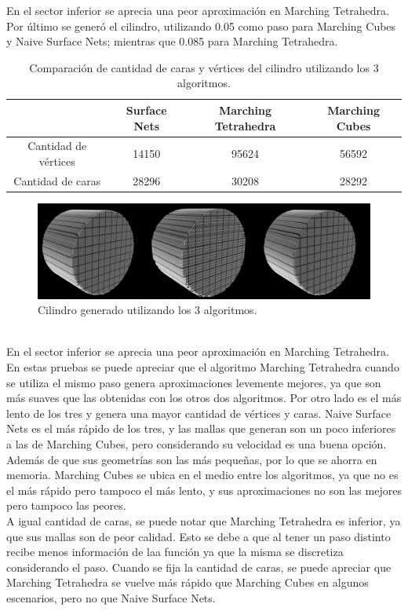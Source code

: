 \documentclass[12pt]{article}
\begin{document}
En el sector inferior se aprecia una peor aproximación en Marching Tetrahedra.
\\Por último se generó el cilindro, utilizando 0.05 como paso para Marching Cubes y Naive Surface Nets; mientras que 0.085 para Marching Tetrahedra.
\begin{table}[h!]
  \centering
  \label{tab:table1}
  \begin{tabular}{cccc}
    \toprule
    & Surface Nets & Marching Tetrahedra & Marching Cubes\\
    \midrule
    Cantidad de vértices & 14150 &  95624 & 56592 \\
    Cantidad de caras &  28296 & 30208 & 28292 \\
    \bottomrule
  \end{tabular}
  \caption{Comparación de cantidad de caras y vértices del cilindro utilizando los 3 algoritmos.}
\end{table}
\begin{figure}[h!]
\includegraphics[width=\linewidth,center]{cilindro2.png}
\caption{Cilindro generado utilizando los 3 algoritmos.}
\end{figure}
\\En el sector inferior se aprecia una peor aproximación en Marching Tetrahedra.
\\En estas pruebas se puede apreciar que el algoritmo Marching Tetrahedra cuando se utiliza el mismo paso genera aproximaciones levemente mejores, ya que son más suaves que las obtenidas con los otros dos algoritmos. Por otro lado es el más lento de los tres y genera una mayor cantidad de vértices y caras. Naive Surface Nets es el más rápido de los tres, y las mallas que generan son un poco inferiores a las de Marching Cubes, pero considerando su velocidad es una buena opción. Además de que sus geometrías son las más pequeñas, por lo que se ahorra en memoria. Marching Cubes se ubica en el medio entre los algoritmos, ya que no es el más rápido pero tampoco el más lento, y sus aproximaciones no son las mejores pero tampoco las peores.
\\ A igual cantidad de caras, se puede notar que Marching Tetrahedra es inferior, ya que sus mallas son de peor calidad. Esto se debe a que al tener un paso distinto recibe menos información de laa función ya que la misma se discretiza considerando el paso. Cuando se fija la cantidad de caras, se puede apreciar que Marching Tetrahedra se vuelve más rápido que Marching Cubes en algunos escenarios, pero no que Naive Surface Nets.
\end{document}
